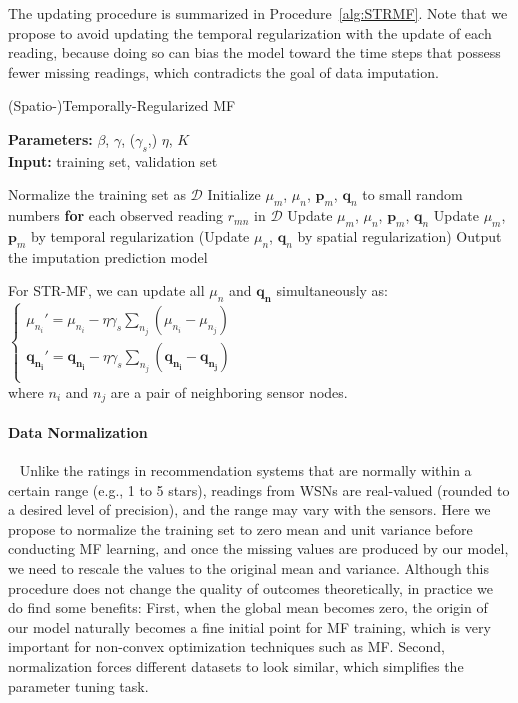 The updating procedure is summarized in Procedure~\ref{alg:STRMF}. Note that we propose to avoid updating the temporal regularization with the update of each reading, because doing so can bias the model toward the time steps that possess fewer missing readings, which contradicts the goal of data imputation. 

\begin{algorithm}[thb]
	\caption{(Spatio-)Temporally-Regularized MF}
	\label{alg:STRMF}
	\textbf{Parameters:} $\beta$, $\gamma$, ($\gamma_s$,) $\eta$, $K$\\
	\textbf{Input:} training set, validation set
	\begin{algorithmic}
		\State Normalize the training set as $\mathcal{D}$
		\State Initialize $\mu_m$, $\mu_n$, $\mathbf{p}_m$, $\mathbf{q}_n$ to small random numbers
		\Repeat
			\State \textbf{for} each observed reading $r_{mn}$ in $\mathcal{D}$
				\State \indent Update $\mu_m$, $\mu_n$, $\mathbf{p}_{m}$, $\mathbf{q}_{n}$
			\State Update $\mu_m$, $\mathbf{p}_m$ by temporal regularization
			\State (Update $\mu_n$, $\mathbf{q}_n$ by spatial regularization)
		\State Output the imputation prediction model
	\end{algorithmic}
\end{algorithm}

For STR-MF, we can update all $\mu_n$ and $\mathbf{q_n}$ simultaneously as:\\
\indent $\begin{cases}
	\mu_{n_i}' = \mu_{n_i} - \eta \gamma_s \sum_{n_j}{(\mu_{n_i} - \mu_{n_j})}\\
	\mathbf{q_{n_i}}' = \mathbf{q_{n_i}} - \eta \gamma_s \sum_{n_j}{(\mathbf{q_{n_i}} - \mathbf{q_{n_j}})}\\
	\end{cases}$\\
where $n_i$ and $n_j$ are a pair of neighboring sensor nodes.

\paragraph*{Data Normalization} ~
Unlike the ratings in recommendation systems that are normally within a certain range (e.g., 1 to 5 stars), readings from WSNs are real-valued (rounded to a desired level of precision), and the range may vary with the sensors.
Here we propose to normalize the training set to zero mean and unit variance before conducting MF learning, and once the missing values are produced by our model, we need to rescale the values to the original mean and variance.
Although this procedure does not change the quality of outcomes theoretically, in practice we do find some benefits: 
First, when the global mean becomes zero, the origin of our model naturally becomes a fine initial point for MF training, which is very important for non-convex optimization techniques such as MF.
Second, normalization forces different datasets to look similar, which simplifies the parameter tuning task. 


